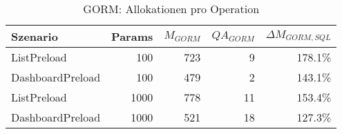
\begin{table}[ht]
\centering
\caption{GORM: Allokationen pro Operation}
\begin{tabular}{lrrrr}
\toprule
Szenario & Params & ${M_{GORM}}$ & ${QA_{GORM}}$ & ${\Delta M_{GORM,SQL}}$ \\
\midrule

	ListPreload & 100 & 723 & 9 & 178.1\% \\
	DashboardPreload & 100 & 479 & 2 & 143.1\% \\
	ListPreload & 1000 & 778 & 11 & 153.4\% \\
	DashboardPreload & 1000 & 521 & 18 & 127.3\% \\
\bottomrule
\end{tabular}
\label{tab:benchmark_gorm_allocsperop}
\end{table}
	